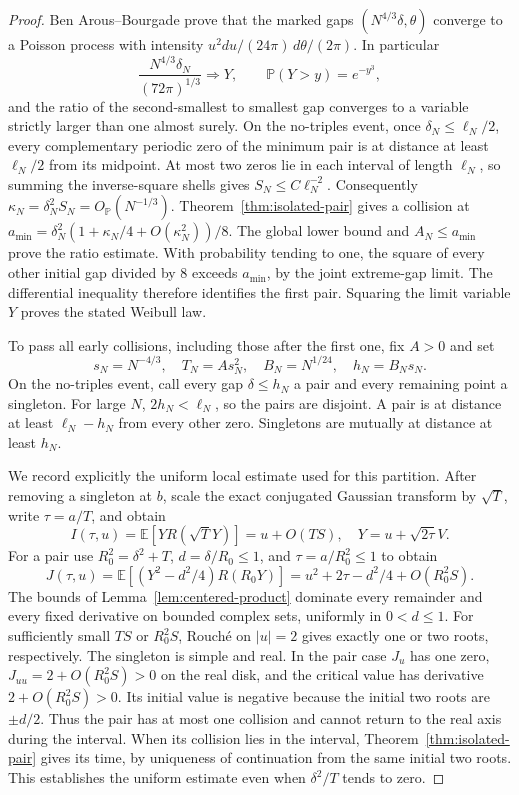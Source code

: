 \begin{proof}
Ben Arous--Bourgade \cite[Theorem~1.1, p.~2650; Corollary~1.2, p.~2651]{ben-arous-bourgade} prove that the marked gaps $(N^{4/3}\delta,\theta)$ converge to a Poisson process with intensity
$u^2du/(24\pi)\,d\theta/(2\pi)$. In particular
\[
 \frac{N^{4/3}\delta_N}{(72\pi)^{1/3}}\Longrightarrow Y,
 \qquad \mathbb P(Y>y)=e^{-y^3},
\]
and the ratio of the second-smallest to smallest gap converges to a variable strictly larger than one almost surely.
On the no-triples event, once $\delta_N\le\ell_N/2$, every complementary periodic zero of the minimum pair is at distance at least $\ell_N/2$ from its midpoint. At most two zeros lie in each interval of length $\ell_N$, so summing the inverse-square shells gives $S_N\le C\ell_N^{-2}$. Consequently
$\kappa_N=\delta_N^2S_N=O_{\mathbb P}(N^{-1/3})$.
Theorem~\ref{thm:isolated-pair} gives a collision at
$a_{\min}=\delta_N^2(1+\kappa_N/4+O(\kappa_N^2))/8$.
The global lower bound and $A_N\le a_{\min}$ prove the ratio estimate. With probability tending to one, the square of every other initial gap divided by $8$ exceeds $a_{\min}$, by the joint extreme-gap limit. The differential inequality therefore identifies the first pair. Squaring the limit variable $Y$ proves the stated Weibull law.

To pass all early collisions, including those after the first one, fix $A>0$ and set
\[
 s_N=N^{-4/3},\quad T_N=As_N^2,\quad
 B_N=N^{1/24},\quad h_N=B_Ns_N.
\]
On the no-triples event, call every gap $\delta\le h_N$ a pair and every remaining point a singleton. For large $N$, $2h_N<\ell_N$, so the pairs are disjoint. A pair is at distance at least $\ell_N-h_N$ from every other zero. Singletons are mutually at distance at least $h_N$.

We record explicitly the uniform local estimate used for this partition. After removing a singleton at $b$, scale the exact conjugated Gaussian transform by $\sqrt T$, write $\tau=a/T$, and obtain
\[
 I(\tau,u)=\mathbb E[Y R(\sqrt T Y)]=u+O(TS),
 \quad Y=u+\sqrt{2\tau}V.
\]
For a pair use $R_0^2=\delta^2+T$, $d=\delta/R_0\le1$, and $\tau=a/R_0^2\le1$ to obtain
\[
 J(\tau,u)=\mathbb E[(Y^2-d^2/4)R(R_0Y)]
           =u^2+2\tau-d^2/4+O(R_0^2S).
\]
The bounds of Lemma~\ref{lem:centered-product} dominate every remainder and every fixed derivative on bounded complex sets, uniformly in $0<d\le1$. For sufficiently small $TS$ or $R_0^2S$, Rouch\'e on $|u|=2$ gives exactly one or two roots, respectively. The singleton is simple and real. In the pair case $J_u$ has one zero, $J_{uu}=2+O(R_0^2S)>0$ on the real disk, and the critical value has derivative $2+O(R_0^2S)>0$. Its initial value is negative because the initial two roots are $\pm d/2$. Thus the pair has at most one collision and cannot return to the real axis during the interval. When its collision lies in the interval, Theorem~\ref{thm:isolated-pair} gives its time, by uniqueness of continuation from the same initial two roots. This establishes the uniform estimate even when $\delta^2/T$ tends to zero.


\end{proof}

